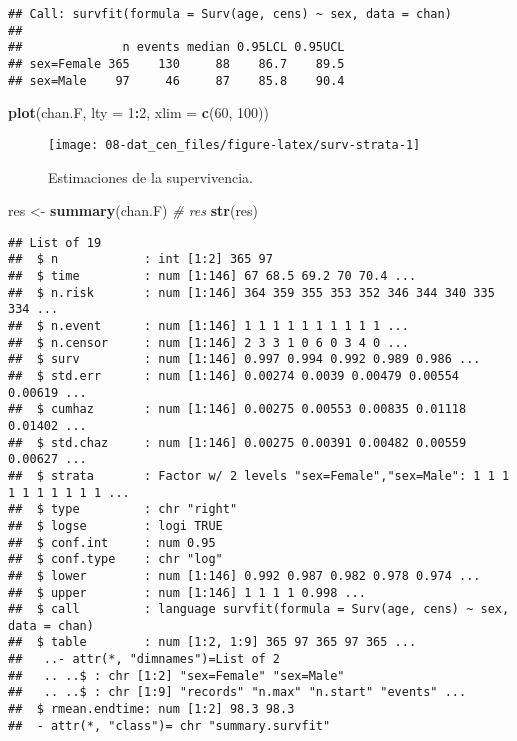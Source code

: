 \documentclass[]{book}
\newenvironment{Shaded}{\begin{snugshade}}{\end{snugshade}}
\newcommand{\KeywordTok}[1]{\textcolor[rgb]{0.13,0.29,0.53}{\textbf{#1}}}
\newcommand{\DataTypeTok}[1]{\textcolor[rgb]{0.13,0.29,0.53}{#1}}
\newcommand{\DecValTok}[1]{\textcolor[rgb]{0.00,0.00,0.81}{#1}}
\newcommand{\StringTok}[1]{\textcolor[rgb]{0.31,0.60,0.02}{#1}}
\newcommand{\CommentTok}[1]{\textcolor[rgb]{0.56,0.35,0.01}{\textit{#1}}}
\newcommand{\OperatorTok}[1]{\textcolor[rgb]{0.81,0.36,0.00}{\textbf{#1}}}
\newcommand{\NormalTok}[1]{#1}
\theoremstyle{break}
\theoremstyle{definition}
\theoremstyle{definition}
\theoremstyle{definition}
\theoremstyle{remark}
\begin{document}
\begin{verbatim}
## Call: survfit(formula = Surv(age, cens) ~ sex, data = chan)
## 
##              n events median 0.95LCL 0.95UCL
## sex=Female 365    130     88    86.7    89.5
## sex=Male    97     46     87    85.8    90.4
\end{verbatim}

\begin{Shaded}
\begin{Highlighting}[]
\KeywordTok{plot}\NormalTok{(chan.F, }\DataTypeTok{lty =} \DecValTok{1}\OperatorTok{:}\DecValTok{2}\NormalTok{, }\DataTypeTok{xlim =} \KeywordTok{c}\NormalTok{(}\DecValTok{60}\NormalTok{, }\DecValTok{100}\NormalTok{))}
\end{Highlighting}
\end{Shaded}

\begin{figure}[!htb]

{\centering \texttt{[image: 08-dat\_cen\_files/figure-latex/surv-strata-1]} 

}

\caption{Estimaciones de la supervivencia.}\label{fig:surv-strata}
\end{figure}

\begin{Shaded}
\begin{Highlighting}[]
\NormalTok{res <-}\StringTok{ }\KeywordTok{summary}\NormalTok{(chan.F)}
\CommentTok{# res}
\KeywordTok{str}\NormalTok{(res)}
\end{Highlighting}
\end{Shaded}

\begin{verbatim}
## List of 19
##  $ n            : int [1:2] 365 97
##  $ time         : num [1:146] 67 68.5 69.2 70 70.4 ...
##  $ n.risk       : num [1:146] 364 359 355 353 352 346 344 340 335 334 ...
##  $ n.event      : num [1:146] 1 1 1 1 1 1 1 1 1 1 ...
##  $ n.censor     : num [1:146] 2 3 3 1 0 6 0 3 4 0 ...
##  $ surv         : num [1:146] 0.997 0.994 0.992 0.989 0.986 ...
##  $ std.err      : num [1:146] 0.00274 0.0039 0.00479 0.00554 0.00619 ...
##  $ cumhaz       : num [1:146] 0.00275 0.00553 0.00835 0.01118 0.01402 ...
##  $ std.chaz     : num [1:146] 0.00275 0.00391 0.00482 0.00559 0.00627 ...
##  $ strata       : Factor w/ 2 levels "sex=Female","sex=Male": 1 1 1 1 1 1 1 1 1 1 ...
##  $ type         : chr "right"
##  $ logse        : logi TRUE
##  $ conf.int     : num 0.95
##  $ conf.type    : chr "log"
##  $ lower        : num [1:146] 0.992 0.987 0.982 0.978 0.974 ...
##  $ upper        : num [1:146] 1 1 1 1 0.998 ...
##  $ call         : language survfit(formula = Surv(age, cens) ~ sex, data = chan)
##  $ table        : num [1:2, 1:9] 365 97 365 97 365 ...
##   ..- attr(*, "dimnames")=List of 2
##   .. ..$ : chr [1:2] "sex=Female" "sex=Male"
##   .. ..$ : chr [1:9] "records" "n.max" "n.start" "events" ...
##  $ rmean.endtime: num [1:2] 98.3 98.3
##  - attr(*, "class")= chr "summary.survfit"
\end{verbatim}
\end{document}
